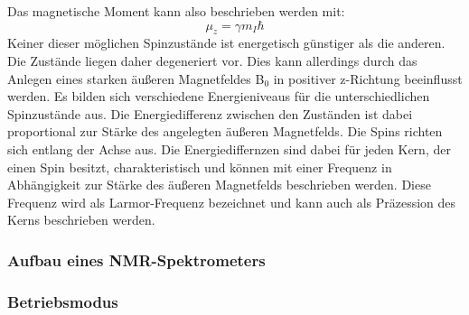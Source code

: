 \documentclass[a4paper, 11pt, headsepline,footsepline,twoside,abstract]{scrbook}
\begin{document}
Das magnetische Moment kann also beschrieben werden mit:
\begin{equation}
\mu_z = \gamma m_I \hbar
\end{equation}
Keiner dieser möglichen Spinzustände ist energetisch günstiger als die anderen. Die Zustände liegen daher degeneriert vor. Dies kann allerdings durch das Anlegen eines starken äußeren Magnetfeldes B$_0$ in positiver z-Richtung beeinflusst werden. Es bilden sich verschiedene Energieniveaus für die unterschiedlichen Spinzustände aus. Die Energiedifferenz zwischen den Zuständen ist dabei proportional zur Stärke des angelegten äußeren Magnetfelds. Die Spins richten sich entlang der Achse aus. Die Energiediffernzen sind dabei für jeden Kern, der einen Spin besitzt, charakteristisch und können mit einer Frequenz in Abhängigkeit zur Stärke des äußeren Magnetfelds beschrieben werden. Diese Frequenz wird als Larmor-Frequenz bezeichnet und kann auch als Präzession des Kerns beschrieben werden.
\subsubsection{Aufbau eines NMR-Spektrometers}
\subsubsection{Betriebsmodus}
\end{document}
